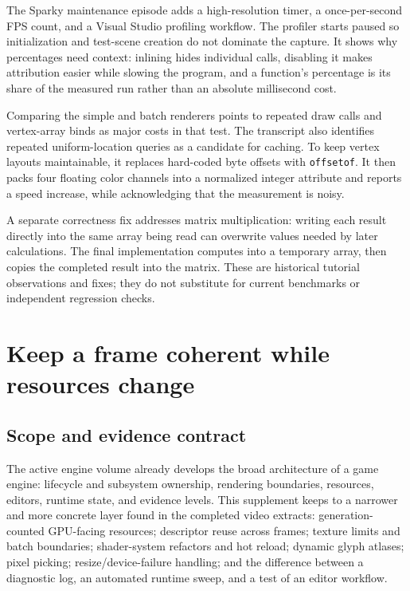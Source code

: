 The Sparky maintenance episode adds a high-resolution timer, a once-per-second FPS count, and a Visual Studio profiling workflow. The profiler starts paused so initialization and test-scene creation do not dominate the capture. It shows why percentages need context: inlining hides individual calls, disabling it makes attribution easier while slowing the program, and a function's percentage is its share of the measured run rather than an absolute millisecond cost.

Comparing the simple and batch renderers points to repeated draw calls and vertex-array binds as major costs in that test. The transcript also identifies repeated uniform-location queries as a candidate for caching. To keep vertex layouts maintainable, it replaces hard-coded byte offsets with \texttt{offsetof}. It then packs four floating color channels into a normalized integer attribute and reports a speed increase, while acknowledging that the measurement is noisy.

A separate correctness fix addresses matrix multiplication: writing each result directly into the same array being read can overwrite values needed by later calculations. The final implementation computes into a temporary array, then copies the completed result into the matrix. These are historical tutorial observations and fixes; they do not substitute for current benchmarks or independent regression checks.

\section{Keep a frame coherent while resources change}\label{06-engine-ii-ch041-keep-a-frame-coherent-while-resources-change}

\subsection{Scope and evidence contract}\label{06-engine-ii-ch041-scope-and-evidence-contract}

The active engine volume already develops the broad architecture of a game engine: lifecycle and subsystem ownership, rendering boundaries, resources, editors, runtime state, and evidence levels. This supplement keeps to a narrower and more concrete layer found in the completed video extracts: generation-counted GPU-facing resources; descriptor reuse across frames; texture limits and batch boundaries; shader-system refactors and hot reload; dynamic glyph atlases; pixel picking; resize/device-failure handling; and the difference between a diagnostic log, an automated runtime sweep, and a test of an editor workflow.

